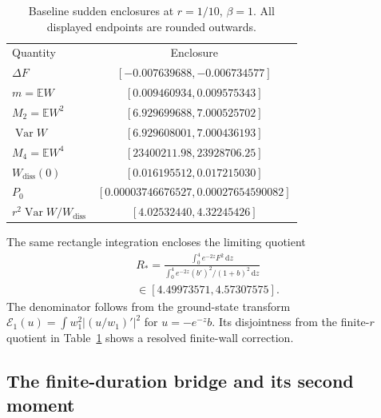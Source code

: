 \documentclass[aps,pra,reprint,superscriptaddress,longbibliography]{revtex4-2}
\newcommand{\dd}{\mathrm d}
\newcommand{\Var}{\operatorname{Var}}
\newcommand{\Wd}{W_{\mathrm{diss}}}
\newcommand{\E}{\mathbb E}
\newcommand{\calE}{\mathcal E}
\begin{document}
\begin{table}[t]
\caption{Baseline sudden enclosures at $r=1/10$, $\beta=1$.
All displayed endpoints are rounded outwards.}
\label{tab:nc-sudden}
\begin{ruledtabular}
\begin{tabular}{lc}
Quantity&Enclosure\\
$\Delta F$&$[-0.007639688,-0.006734577]$\\
$m=\E W$&$[0.009460934,0.009575343]$\\
$M_2=\E W^2$&$[6.929699688,7.000525702]$\\
$\Var W$&$[6.929608001,7.000436193]$\\
$M_4=\E W^4$&$[23400211.98,23928706.25]$\\
$\Wd(0)$&$[0.016195512,0.017215030]$\\
$P_0$&$[0.00003746676527,0.00027654590082]$\\
$r^2\Var W/\Wd$&$[4.02532440,4.32245426]$
\end{tabular}
\end{ruledtabular}
\end{table}

The same rectangle integration encloses the limiting quotient
\begin{equation}
 \begin{gathered}
 R_*=
 \frac{\int_0^4e^{-2z}F^2\,\dd z}
      {\int_0^4e^{-2z}(b')^2/(1+b)^2\,\dd z}
 \\\in[4.49973571,4.57307575].
 \end{gathered}
 \label{eq:nc-limit-ratio}
\end{equation}
The denominator follows from the ground-state transform
$\calE_1(u)=\int w_1^2|(u/w_1)'|^2$ for $u=-e^{-z}b$.
Its disjointness from the finite-$r$ quotient in
Table~\ref{tab:nc-sudden} shows a resolved finite-wall correction.

\subsection{The finite-duration bridge and its second moment}
\end{document}
